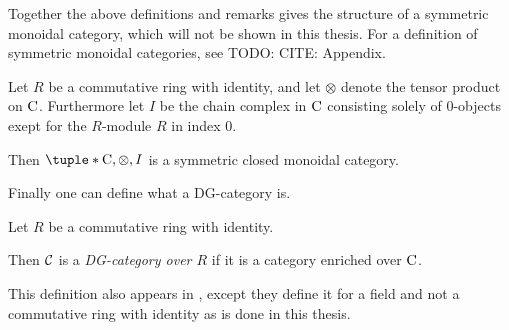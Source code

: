 Together the above definitions and remarks gives the structure of a symmetric monoidal category, which will not be shown in this thesis. For a definition of symmetric monoidal categories, see TODO: CITE: Appendix.

\begin{fact}
    Let \( R \) be a commutative ring with identity, and let \( \otimes \) denote the tensor product on \( \operatorname{C} \). Furthermore let \( I \) be the chain complex in \( \operatorname{C} \) consisting solely of \( 0 \)-objects exept for the \( R \)-module \( R \) in index \( 0 \).

    Then \( \tuple*{\C, \otimes, I} \) is a symmetric closed monoidal category.
\end{fact}

Finally one can define what a DG-category is.

\begin{definition}[DG-category]
    Let \( R \) be a commutative ring with identity.

    Then \( {\mathcal{C}} \) is a \emph{DG-category over \( R \)} if it is a category enriched over \( \operatorname{C} \).
\end{definition}

This definition also appears in \cite[p. 29]{Jasso-Muro_2023}, except they define it for a field and not a commutative ring with identity as is done in this thesis.
